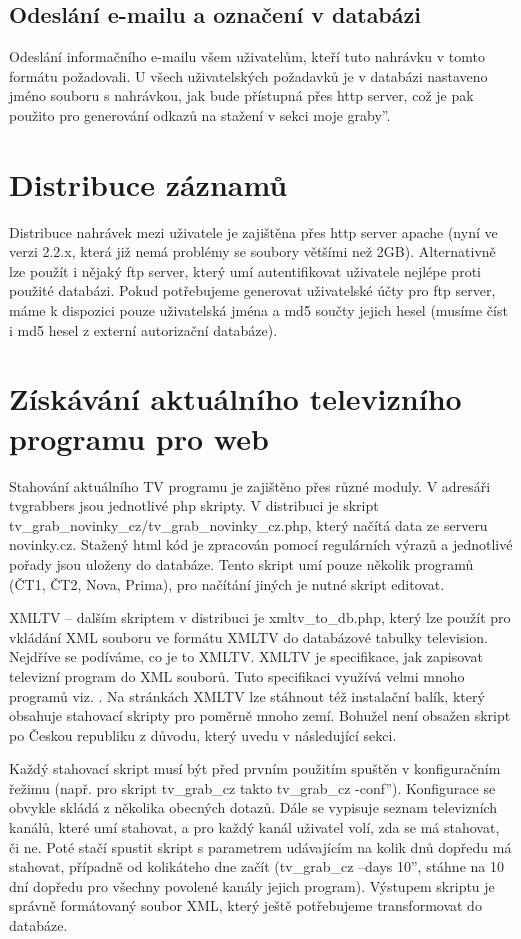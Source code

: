 \subsection{Odeslání e-mailu a označení v databázi}
Odeslání informačního e-mailu všem uživatelům, kteří tuto nahrávku v tomto formátu požadovali. U všech uživatelských požadavků je v databázi nastaveno jméno souboru s nahrávkou, jak bude přístupná přes http server, což je pak použito pro generování odkazů na stažení v sekci \quotedblbase moje graby''.

\section{Distribuce záznamů}
Distribuce nahrávek mezi uživatele je zajištěna přes http server apache (nyní ve verzi 2.2.x, která již nemá problémy se soubory většími než 2GB). Alternativně lze použít i nějaký ftp server, který umí autentifikovat uživatele nejlépe proti použité databázi. Pokud potřebujeme generovat uživatelské účty pro ftp server, máme k dispozici pouze uživatelská jména a md5 součty jejich hesel (musíme číst i md5 hesel z externí autorizační databáze).

\section{Získávání aktuálního televizního programu pro web}
Stahování aktuálního TV programu je zajištěno přes různé moduly. V adresáři tvgrabbers jsou jednotlivé php skripty. V distribuci je skript tv\_grab\_novinky\_cz/tv\_grab\_novinky\_cz.php, který načítá data ze serveru novinky.cz. Stažený html kód je zpracován pomocí regulárních výrazů a jednotlivé pořady jsou uloženy do databáze. Tento skript umí pouze několik programů (ČT1, ČT2, Nova, Prima), pro načítání jiných je nutné skript editovat.

XMLTV -- dalším skriptem v distribuci je xmltv\_to\_db.php, který lze použít pro vkládání XML souboru ve formátu XMLTV do databázové tabulky television. Nejdříve se podíváme, co je to XMLTV. XMLTV je specifikace, jak zapisovat televizní program do XML souborů. Tuto specifikaci využívá velmi mnoho programů viz. \cite{xmltvURL}. Na stránkách XMLTV lze stáhnout též instalační balík, který obsahuje stahovací skripty pro poměrně mnoho zemí. Bohužel není obsažen skript po Českou republiku z důvodu, který uvedu v následující sekci.

Každý stahovací skript musí být před prvním použitím spuštěn v konfiguračním řežimu (např. pro skript tv\_grab\_cz takto \quotedblbase tv\_grab\_cz -conf''). Konfigurace se obvykle skládá z několika obecných dotazů. Dále se vypisuje seznam televizních kanálů, které umí stahovat, a pro každý kanál uživatel volí, zda se má stahovat, či ne. Poté stačí spustit skript s parametrem udávajícím na kolik dnů dopředu má stahovat, případně od kolikáteho dne začít (\quotedblbase tv\_grab\_cz --days 10'', stáhne na 10 dní dopředu pro všechny povolené kanály jejich program). Výstupem skriptu je správně formátovaný soubor XML, který ještě potřebujeme transformovat do databáze.

